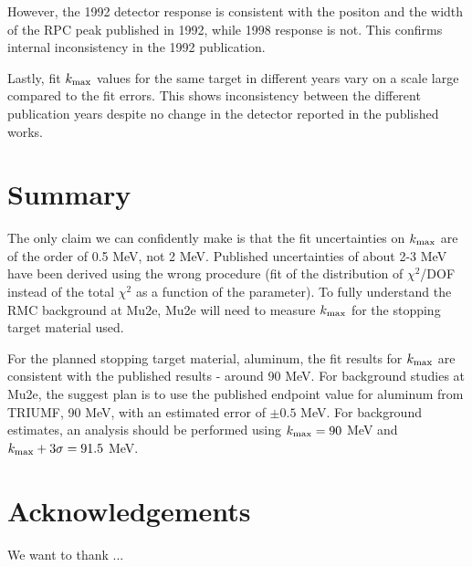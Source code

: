 \documentclass[12pt]{article}
\newcommand {\kmax}         {\mbox{$k_{\rm max}$}}
\begin{document}
However, the 1992 detector response is consistent with the positon and the width of the 
RPC peak published in 1992, while 1998 response is not. 
This confirms internal inconsistency in the 1992 publication.

Lastly, fit $\kmax$ values for the same target in different years vary on a scale large compared
to the fit errors. This shows inconsistency between the different publication years despite
no change in the detector reported in the published works.

\section{ Summary }

The only claim we can confidently make is that the fit uncertainties on $\kmax$ are
of the order of 0.5 MeV, not 2 MeV. Published uncertainties of about 2-3 MeV
have been derived using the wrong procedure (fit of the distribution of $\chi^2$/DOF
instead of the total $\chi^2$ as a function of the parameter). To fully understand the RMC background at Mu2e,
Mu2e will need to measure $\kmax$ for the stopping target material used.


For the planned stopping target material, aluminum, the fit results for $\kmax$ are consistent with 
the published results - around 90 MeV. For background studies at Mu2e, the suggest plan is to use
the published endpoint value for aluminum from TRIUMF, 90 MeV, with an estimated error of 
$\pm 0.5$ MeV. For background estimates, an analysis should be performed using
$\kmax = 90$ MeV and $\kmax + 3\sigma = 91.5$ MeV.





\section{ Acknowledgements }

We want to thank ...




\appendix



\end{document}
